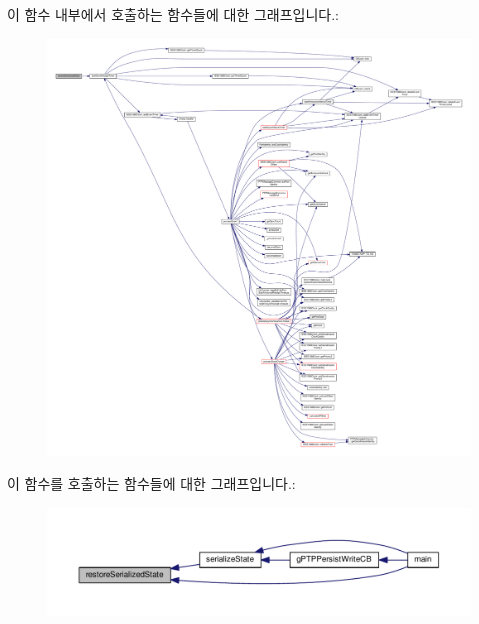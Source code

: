 이 함수 내부에서 호출하는 함수들에 대한 그래프입니다.\+:
\nopagebreak
\begin{figure}[H]
\begin{center}
\leavevmode
\includegraphics[width=350pt]{class_common_port_a383669aeae1b1eeaa021267a0041d163_cgraph}
\end{center}
\end{figure}




이 함수를 호출하는 함수들에 대한 그래프입니다.\+:
\nopagebreak
\begin{figure}[H]
\begin{center}
\leavevmode
\includegraphics[width=350pt]{class_common_port_a383669aeae1b1eeaa021267a0041d163_icgraph}
\end{center}
\end{figure}


